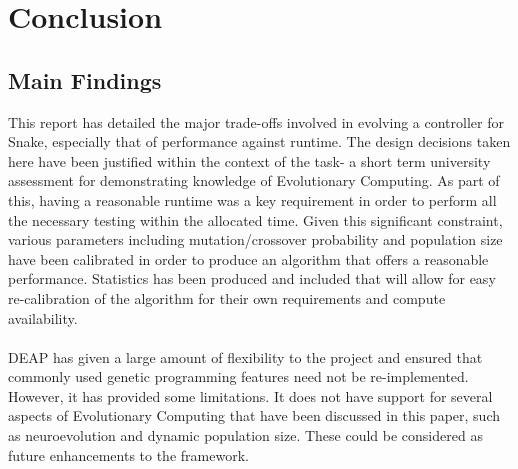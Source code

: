 \documentclass[12pt]{article}
\begin{document}


\section{Conclusion} %
\subsection{Main Findings}
This report has detailed the major trade-offs involved in evolving a controller for Snake, especially that of performance against runtime. The design decisions taken here have been justified within the context of the task- a short term university assessment for demonstrating knowledge of Evolutionary Computing. As part of this, having a reasonable runtime was a key requirement in order to perform all the necessary testing within the allocated time. Given this significant constraint, various parameters including mutation/crossover probability and population size have been calibrated in order to produce an algorithm that offers a reasonable performance. Statistics has been produced and included that will allow for easy re-calibration of the algorithm for their own requirements and compute availability.
\\\\
DEAP has given a large amount of flexibility to the project and ensured that commonly used genetic programming features need not be re-implemented. However, it has provided some limitations. It does not have support for several aspects of Evolutionary Computing that have been discussed in this paper, such as neuroevolution and dynamic population size. These could be considered as future enhancements to the framework.
\end{document}
